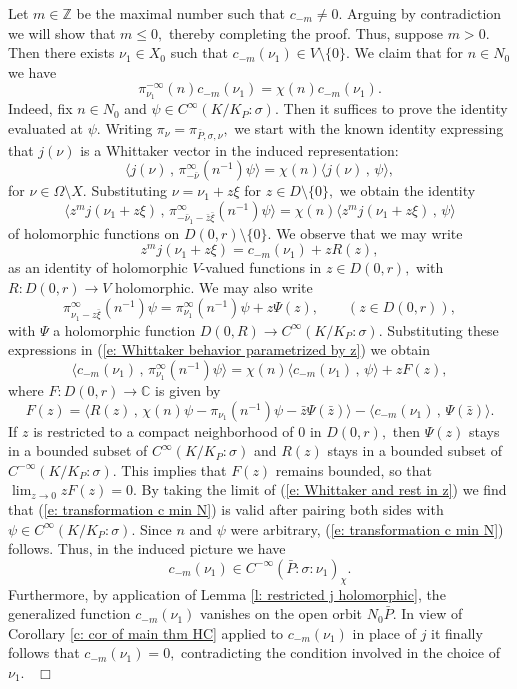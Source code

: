 \documentclass[12pt,a4paper]{article}
\def\qed{~\hfill\hbox{$\Box$}\medbreak}
\def\qquad{\quad\quad}
\def\msy#1{{\mathbb #1}}
\def\C{{\msy C}}
\def\Z{{\msy Z}}
\def\gs{\sigma}
\def\to{\rightarrow}
\def\inp#1#2{\langle#1\,,\,#2\rangle}
\numberwithin{Thm}{section}
\numberwithin{equation}{section}
\numberwithin{equation}{section}
\def\cchi{\chi}
\def\gsP{\gs}%
\begin{document}
Let $m \in \Z$ be the maximal number such that $c_{-m} \neq 0.$ Arguing by contradiction
we will show that $m \leq 0,$ thereby completing the proof. Thus, suppose $m > 0.$ Then there
exists $\nu_1 \in X_0$ such that $c_{-m}(\nu_1) \in V\setminus \{ 0 \}.$ We claim 
that for $n \in N_0$ we have 
\begin{equation}
\label{e: transformation c min N}
\pi_{\nu_1}^{-\infty}(n) c_{-m}(\nu_1) = \cchi(n) c_{-m} (\nu_1). 
\end{equation} 
Indeed, fix $n \in N_0$ and $\psi \in C^\infty(K/K_P:\gs).$ Then
it suffices to prove the identity evaluated at $\psi.$ Writing $\pi_\nu = \pi_{\bar P,\gs, \nu},$ 
we start with the known identity expressing that $j(\nu)$ is a Whittaker vector in the induced representation:
$$ 
\inp {j(\nu) }{\pi_{-\bar\nu}^\infty (n^{-1})\psi} = \cchi(n) \inp{j(\nu)}{\psi},
$$ 
for $\nu \in \Omega\setminus X.$ Substituting $\nu = \nu_1 + z \xi$ 
for $z \in D\setminus \{0\},$ we obtain the identity 
\begin{equation}
\label{e: Whittaker behavior parametrized by z}
\inp{z^m j(\nu_1 + z \xi)}{\pi_{-\bar\nu_1 -\bar  z\bar \xi}^{\infty}(n^{-1})\psi} = 
\cchi(n)\inp{z^m j(\nu_1 + z \xi)}{\psi}
\end{equation}
of holomorphic functions on $D(0,r)\setminus \{0\}.$ We observe that we may write 
$$ 
z^m j(\nu_1 + z\xi) = c_{-m}(\nu_1) + z R(z),
$$ 
as an identity of holomorphic $V$-valued functions in $z \in D(0,r),$ with $R: D(0,r) \to V$ 
holomorphic. We may also write 
$$ 
\pi_{\nu_1 - z\bar \xi}^{\infty}(n^{-1})\psi =  \pi_{\nu_1}^\infty(n^{-1})\psi+ z \Psi(z), \qquad (z \in D(0,r)),
$$ 
with $\Psi$ a holomorphic function $D(0,R) \to C^\infty(K/K_P:\gsP).$ Substituting these 
expressions in (\ref{e: Whittaker behavior parametrized by z}) we obtain
\begin{equation}
\label{e: Whittaker and rest in z}
\inp{c_{-m}(\nu_1)}{\pi_{\nu_1}^{\infty}(n^{-1})\psi} =\cchi(n)  \inp{c_{-m}(\nu_1)}{\psi} + z F(z),
\end{equation}
where $F: D(0, r) \to \C$ is given by 
$$ 
F(z) =  \inp{R(z)}
{\cchi(n)\psi - \pi_{\nu_1}(n^{-1}) \psi - \bar z \Psi(\bar z)} -  \inp{c_{-m}(\nu_1)}{ \Psi(\bar z) }.
$$ 
If $z$ is restricted to a compact neighborhood of $0$ in $D(0,r),$ then $\Psi(z)$ stays in a bounded 
subset of $C^\infty(K/K_P:\gsP)$ and $R(z)$ stays in a bounded subset of $C^{-\infty}(K/K_P:\gsP).$ 
This implies that $F(z)$ remains bounded, so that $\lim_{z \to 0} zF(z) = 0.$ By taking  the limit 
of (\ref{e: Whittaker and rest in z}) we find that (\ref{e: transformation c min N}) is valid after pairing
both sides with $\psi \in C^\infty(K/K_P:\gsP).$ Since $n$ and $\psi$ were arbitrary, (\ref{e: transformation c min N}) follows.
Thus, in the induced picture we have 
$$ 
c_{-m}(\nu_1) \in C^{-\infty}(\bar P:\gs: \nu_1)_{\cchi}.
$$ 
Furthermore, by application of Lemma \ref{l: restricted j holomorphic}, the generalized function 
$c_{-m}(\nu_1)$ vanishes on the open orbit $N_0 \bar P.$ 
In view of Corollary \ref{c: cor of main thm HC} applied to $c_{-m}(\nu_1)$ in place of 
$j$ it finally follows that $c_{-m}(\nu_1) = 0,$ contradicting the condition involved in 
 the choice of $\nu_1.$ 
\qed
\end{document}
